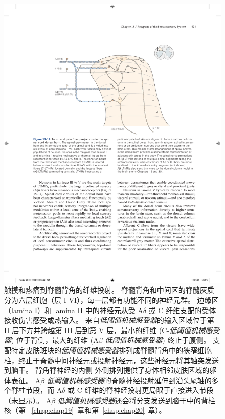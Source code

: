 \begin{figure}[htbp]
	\centering
	\includegraphics[width=1.0\linewidth]{chap18/fig_18_14}
	\caption{触摸和疼痛到脊髓背角的纤维投射。 脊髓背角和中间区的脊髓灰质分为六层细胞（层 I-VI），每一层都有功能不同的神经元群。
		边缘区（lamina I）和 lamina II 中的神经元从受 A$\delta$ 或 C 纤维支配的受体接收伤害感受或热输入。 
		来自\textit{低阈值机械感受器}的输入区域位于第 II 层下方并跨越第 III 层到第 V 层，最小的纤维 (C-\textit{低阈值机械感受器}) 位于背侧，最大的纤维 (A$\beta$ \textit{低阈值机械感受器}) 终止于腹侧。
		支配特定皮肤斑块的\textit{低阈值机械感受器}排列成脊髓背角中的狭窄细胞柱，终止于脊髓中间神经元或投射神经元，这些神经元将其轴突发送到脑干。
		背角脊神经的内侧-外侧排列提供了身体相邻皮肤区域的躯体表征。
		A$\beta$ \textit{低阈值机械感受器}的脊髓神经投射延伸到沿头尾轴的多个脊柱节段，而 A$\delta$ 或 C 纤维的脊神经投射更局限于直接进入节段（未显示）。
		A$\beta$ \textit{低阈值机械感受器}还会将分支发送到脑干中的背柱核（第 ~\ref{chap:chap19}~章和第~\ref{chap:chap20}~章）。}
	\label{fig:18_14}
\end{figure}


